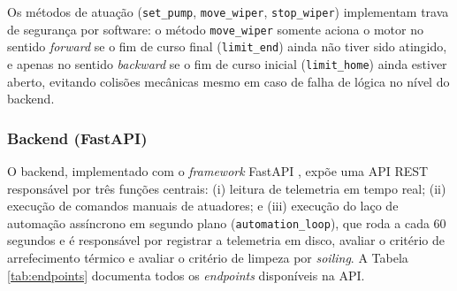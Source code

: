 \documentclass[12pt, a4paper]{article}
\begin{document}
Os métodos de atuação (\texttt{set\_pump}, \texttt{move\_wiper}, \texttt{stop\_wiper}) implementam trava de segurança por software: o método \texttt{move\_wiper} somente aciona o motor no sentido \textit{forward} se o fim de curso final (\texttt{limit\_end}) ainda não tiver sido atingido, e apenas no sentido \textit{backward} se o fim de curso inicial (\texttt{limit\_home}) ainda estiver aberto, evitando colisões mecânicas mesmo em caso de falha de lógica no nível do backend.

\subsubsection{Backend (FastAPI)}

O backend, implementado com o \textit{framework} FastAPI \cite{fastapi_doc}, expõe uma API REST responsável por três funções centrais: (i) leitura de telemetria em tempo real; (ii) execução de comandos manuais de atuadores; e (iii) execução do laço de automação assíncrono em segundo plano (\texttt{automation\_loop}), que roda a cada 60 segundos e é responsável por registrar a telemetria em disco, avaliar o critério de arrefecimento térmico e avaliar o critério de limpeza por \textit{soiling}. A Tabela \ref{tab:endpoints} documenta todos os \textit{endpoints} disponíveis na API.
\end{document}
